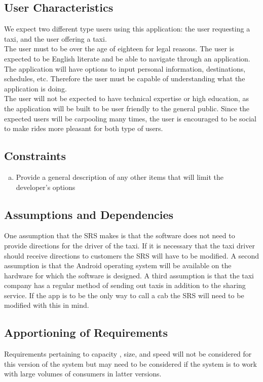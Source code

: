 \documentclass[english]{article}
\begin{document}
\subsection{User Characteristics}
\label{sub:user_characteristics}
We expect two different type users using this application: the user requesting a taxi, and the user offering a taxi.
\\
\bigskip
The user must to be over the age of eighteen for legal reasons. The user is expected to be English literate and be able to navigate through an application. The application will have options to input personal information, destinations, schedules, etc. Therefore the user must be capable of understanding what the application is doing.
\\
\bigskip
The user will not be expected to have technical expertise or high education, as the application will be built to be user friendly to the general public. Since the expected users will be carpooling many times, the user is encouraged to be social to make rides more pleasant for both type of users. 

\subsection{Constraints}
\label{sub:constraints}
\begin{enumerate}[a)]
	\item Provide a general description of any other items that will limit the developer's options
\end{enumerate}

\subsection{Assumptions and Dependencies}
\label{sub:assumptions_and_dependencies}
One assumption that the SRS makes is that the software does not need to provide directions for the driver of the taxi. If it is necessary that the taxi driver should receive directions to customers the SRS will have to be modified. A second assumption is that the Android operating system will be available on the hardware for which the software is designed. A third assumption is that the taxi company has a regular method of sending out taxis in addition to the sharing service. If the app is to be the only way to call a cab the SRS will need to be modified with this in mind. 

\subsection{Apportioning of Requirements}
\label{sub:apportioning_of_requirements}
Requirements pertaining to capacity , size, and speed will not be considered for this version of the system but may need to be considered if the system is to work with large volumes of consumers in latter versions. 
\end{document}
